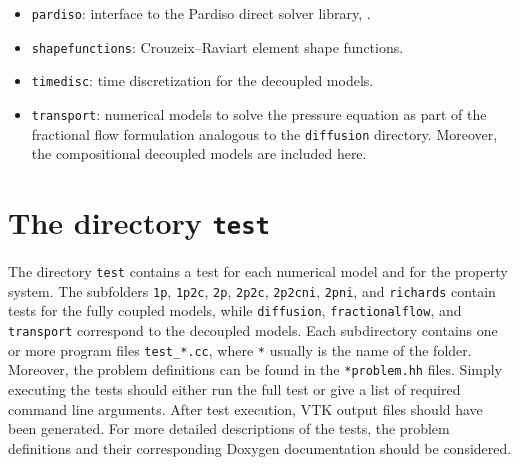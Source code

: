 \begin{itemize}
\item \texttt{pardiso}: interface to the Pardiso direct solver library, \cite{Pardiso}. 


\item \texttt{shapefunctions}:  Crouzeix--Raviart element shape functions. 


\item \texttt{timedisc}: time discretization for the decoupled models. 


\item \texttt{transport}: numerical models to solve the pressure equation 
as part of the fractional flow formulation analogous to the \texttt{diffusion} 
directory. Moreover, the compositional decoupled models are included here. 


\end{itemize}



\section{The directory \texttt{test}}\label{sec:test}


The directory \texttt{test} contains a test for each numerical model and for 
the property system. The subfolders \texttt{1p},  \texttt{1p2c},  \texttt{2p},  \texttt{2p2c},  
\texttt{2p2cni},  \texttt{2pni},  and \texttt{richards} contain tests for the fully 
coupled models, while \texttt{diffusion}, \texttt{fractionalflow}, and \texttt{transport} 
correspond to the decoupled models. Each subdirectory 
contains one or more program files \texttt{test\_*.cc}, where \texttt{*} usually is the 
name of the folder. Moreover, the problem definitions can be found 
in the \texttt{*problem.hh} files. Simply executing the tests should either run the 
full test or give a list of required command line arguments. After test execution, 
VTK output files should have been generated. 
For more detailed descriptions of the tests, the problem definitions and their corresponding 
Doxygen documentation should be considered. 

